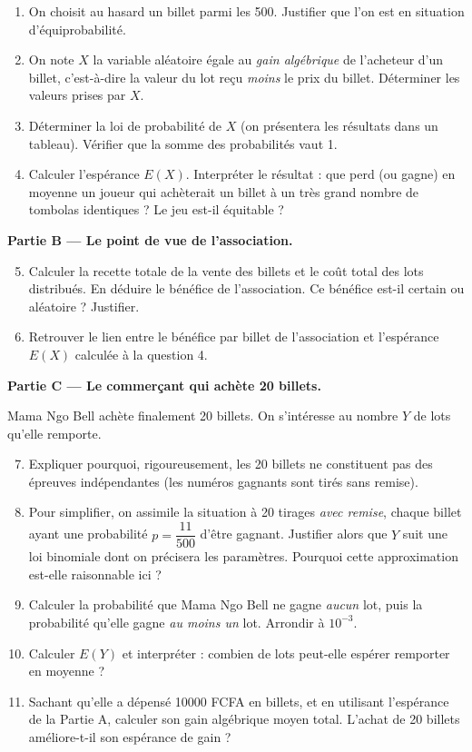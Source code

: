 \documentclass[11pt]{article}
\newcommand{\cle}[1]{{\popxbold\color{popdark}#1}}
\begin{document}
\begin{enumerate}
\item On choisit au hasard un billet parmi les 500. Justifier que l'on est en situation d'\cle{équiprobabilité}.
\item On note $X$ la variable aléatoire égale au \emph{gain algébrique} de l'acheteur d'un billet, c'est-à-dire la valeur du lot reçu \emph{moins} le prix du billet. Déterminer les valeurs prises par $X$.
\item Déterminer la loi de probabilité de $X$ (on présentera les résultats dans un tableau). Vérifier que la somme des probabilités vaut 1.
\item Calculer l'espérance $E(X)$. Interpréter le résultat : que perd (ou gagne) en moyenne un joueur qui achèterait un billet à un très grand nombre de tombolas identiques ? Le jeu est-il équitable ?
\end{enumerate}

\textbf{Partie B — Le point de vue de l'association.}

\begin{enumerate}
\setcounter{enumi}{4}
\item Calculer la recette totale de la vente des billets et le coût total des lots distribués. En déduire le bénéfice de l'association. Ce bénéfice est-il certain ou aléatoire ? Justifier.
\item Retrouver le lien entre le bénéfice par billet de l'association et l'espérance $E(X)$ calculée à la question 4.
\end{enumerate}

\textbf{Partie C — Le commerçant qui achète 20 billets.}

Mama Ngo Bell achète finalement 20 billets. On s'intéresse au nombre $Y$ de lots qu'elle remporte.

\begin{enumerate}
\setcounter{enumi}{6}
\item Expliquer pourquoi, rigoureusement, les 20 billets ne constituent pas des épreuves indépendantes (les numéros gagnants sont tirés sans remise).
\item Pour simplifier, on assimile la situation à 20 tirages \emph{avec remise}, chaque billet ayant une probabilité $p = \dfrac{11}{500}$ d'être gagnant. Justifier alors que $Y$ suit une loi binomiale dont on précisera les paramètres. Pourquoi cette approximation est-elle raisonnable ici ?
\item Calculer la probabilité que Mama Ngo Bell ne gagne \emph{aucun} lot, puis la probabilité qu'elle gagne \emph{au moins un} lot. Arrondir à $10^{-3}$.
\item Calculer $E(Y)$ et interpréter : combien de lots peut-elle espérer remporter en moyenne ?
\item Sachant qu'elle a dépensé \num{10000} FCFA en billets, et en utilisant l'espérance de la Partie A, calculer son gain algébrique moyen total. L'achat de 20 billets améliore-t-il son espérance de gain ?
\end{enumerate}
\end{document}
